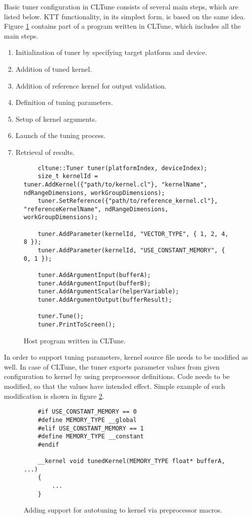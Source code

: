 \documentclass
[
    digital, %
    oneside, %
    table, %
    nolof, %
    nolot, %
    nocover %
]{fithesis3}
\begin{document}
Basic tuner configuration in CLTune consists of several main steps, which are listed below. KTT functionality, in its simplest form, is based on the
same idea. Figure \ref{cltune-example} contains part of a program written in CLTune, which includes all the main steps.
\begin{enumerate}
    \item Initialization of tuner by specifying target platform and device.
    \item Addition of tuned kernel.
    \item Addition of reference kernel for output validation.
    \item Definition of tuning parameters.
    \item Setup of kernel arguments.
    \item Launch of the tuning process.
    \item Retrieval of results.
\end{enumerate}
\begin{figure}
    \begin{lstlisting}
    cltune::Tuner tuner(platformIndex, deviceIndex);
    size_t kernelId = tuner.AddKernel({"path/to/kernel.cl"}, "kernelName", ndRangeDimensions, workGroupDimensions);
    tuner.SetReference({"path/to/reference_kernel.cl"}, "referenceKernelName", ndRangeDimensions, workGroupDimensions);
    
    tuner.AddParameter(kernelId, "VECTOR_TYPE", { 1, 2, 4, 8 });
    tuner.AddParameter(kernelId, "USE_CONSTANT_MEMORY", { 0, 1 });
    
    tuner.AddArgumentInput(bufferA);
    tuner.AddArgumentInput(bufferB);
    tuner.AddArgumentScalar(helperVariable);
    tuner.AddArgumentOutput(bufferResult);
    
    tuner.Tune();
    tuner.PrintToScreen();
    \end{lstlisting}
    \caption{Host program written in CLTune.}
    \label{cltune-example}
\end{figure}

In order to support tuning parameters, kernel source file needs to be modified as well. In case of CLTune, the tuner exports parameter values from
given configuration to kernel by using preprocessor definitions. Code needs to be modified, so that the values have intended effect. Simple example
of such modification is shown in figure \ref{cltune-example-kernel}.
\begin{figure}
    \begin{lstlisting}
    #if USE_CONSTANT_MEMORY == 0
    #define MEMORY_TYPE __global
    #elif USE_CONSTANT_MEMORY == 1
    #define MEMORY_TYPE __constant
    #endif
    
    __kernel void tunedKernel(MEMORY_TYPE float* bufferA, ...)
    {
        ...
    }
    \end{lstlisting}
    \caption{Adding support for autotuning to kernel via preprocessor macros.}
    \label{cltune-example-kernel}
\end{figure}
\end{document}
